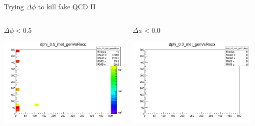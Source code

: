 \documentclass[8pt]{beamer}
\begin{document}
\begin{frame}{Trying $\Delta\phi$ to kill fake QCD II}
\begin{columns}
\begin{block}{$\Delta\phi<0.5$}
 
\centering
\includegraphics[width=\linewidth]{img/dphi_0p5_met_genVsReco.png} 
 
\end{block}

\begin{block}{$\Delta\phi<0.0$}
 
\centering
\includegraphics[width=\linewidth]{img/dphi_0p0_met_genVsReco.png} 
 
\end{block}


\end{columns} 
 
\end{frame}
\end{document}
